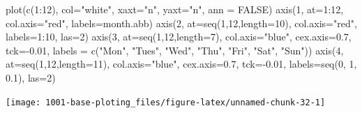 \documentclass[
]{book}
\newenvironment{Shaded}{\begin{snugshade}}{\end{snugshade}}
\newcommand{\AttributeTok}[1]{\textcolor[rgb]{0.77,0.63,0.00}{#1}}
\newcommand{\ConstantTok}[1]{\textcolor[rgb]{0.00,0.00,0.00}{#1}}
\newcommand{\DecValTok}[1]{\textcolor[rgb]{0.00,0.00,0.81}{#1}}
\newcommand{\FloatTok}[1]{\textcolor[rgb]{0.00,0.00,0.81}{#1}}
\newcommand{\FunctionTok}[1]{\textcolor[rgb]{0.00,0.00,0.00}{#1}}
\newcommand{\NormalTok}[1]{#1}
\newcommand{\SpecialCharTok}[1]{\textcolor[rgb]{0.00,0.00,0.00}{#1}}
\newcommand{\StringTok}[1]{\textcolor[rgb]{0.31,0.60,0.02}{#1}}
\begin{document}
\begin{Shaded}
\begin{Highlighting}[]
\FunctionTok{plot}\NormalTok{(}\FunctionTok{c}\NormalTok{(}\DecValTok{1}\SpecialCharTok{:}\DecValTok{12}\NormalTok{), }\AttributeTok{col=}\StringTok{"white"}\NormalTok{, }\AttributeTok{xaxt=}\StringTok{"n"}\NormalTok{, }\AttributeTok{yaxt=}\StringTok{"n"}\NormalTok{, }\AttributeTok{ann =} \ConstantTok{FALSE}\NormalTok{)}
\FunctionTok{axis}\NormalTok{(}\DecValTok{1}\NormalTok{, }\AttributeTok{at=}\DecValTok{1}\SpecialCharTok{:}\DecValTok{12}\NormalTok{, }\AttributeTok{col.axis=}\StringTok{"red"}\NormalTok{, }\AttributeTok{labels=}\NormalTok{month.abb)}
\FunctionTok{axis}\NormalTok{(}\DecValTok{2}\NormalTok{, }\AttributeTok{at=}\FunctionTok{seq}\NormalTok{(}\DecValTok{1}\NormalTok{,}\DecValTok{12}\NormalTok{,}\AttributeTok{length=}\DecValTok{10}\NormalTok{), }\AttributeTok{col.axis=}\StringTok{"red"}\NormalTok{, }\AttributeTok{labels=}\DecValTok{1}\SpecialCharTok{:}\DecValTok{10}\NormalTok{, }\AttributeTok{las=}\DecValTok{2}\NormalTok{)}
\FunctionTok{axis}\NormalTok{(}\DecValTok{3}\NormalTok{, }\AttributeTok{at=}\FunctionTok{seq}\NormalTok{(}\DecValTok{1}\NormalTok{,}\DecValTok{12}\NormalTok{,}\AttributeTok{length=}\DecValTok{7}\NormalTok{), }\AttributeTok{col.axis=}\StringTok{"blue"}\NormalTok{, }\AttributeTok{cex.axis=}\FloatTok{0.7}\NormalTok{, }
     \AttributeTok{tck=}\SpecialCharTok{{-}}\FloatTok{0.01}\NormalTok{, }\AttributeTok{labels =} \FunctionTok{c}\NormalTok{(}\StringTok{"Mon"}\NormalTok{, }\StringTok{"Tues"}\NormalTok{, }\StringTok{"Wed"}\NormalTok{, }\StringTok{"Thu"}\NormalTok{, }\StringTok{"Fri"}\NormalTok{, }\StringTok{"Sat"}\NormalTok{, }\StringTok{"Sun"}\NormalTok{)) }
\FunctionTok{axis}\NormalTok{(}\DecValTok{4}\NormalTok{, }\AttributeTok{at=}\FunctionTok{seq}\NormalTok{(}\DecValTok{1}\NormalTok{,}\DecValTok{12}\NormalTok{,}\AttributeTok{length=}\DecValTok{11}\NormalTok{), }\AttributeTok{col.axis=}\StringTok{"blue"}\NormalTok{, }\AttributeTok{cex.axis=}\FloatTok{0.7}\NormalTok{, }
     \AttributeTok{tck=}\SpecialCharTok{{-}}\FloatTok{0.01}\NormalTok{, }\AttributeTok{labels=}\FunctionTok{seq}\NormalTok{(}\DecValTok{0}\NormalTok{, }\DecValTok{1}\NormalTok{, }\FloatTok{0.1}\NormalTok{), }\AttributeTok{las=}\DecValTok{2}\NormalTok{)}
\end{Highlighting}
\end{Shaded}

\begin{center}\texttt{[image: 1001-base-ploting\_files/figure-latex/unnamed-chunk-32-1]} \end{center}
\end{document}
